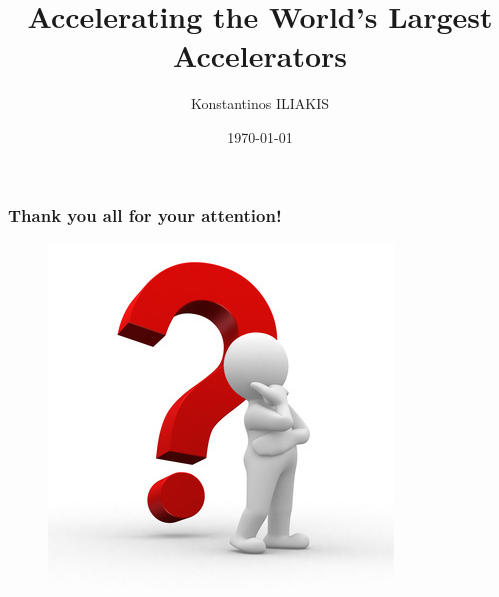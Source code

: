\documentclass{beamer}
\title[HPC @ CERN]{Accelerating the World's Largest Accelerators} %
\author{Konstantinos ILIAKIS} %
\institute{CERN/NTUA} %
\date{\today} %
\begin{document}
\begin{frame}
\titlepage %
\end{frame}






%	


\begin{frame}
	\frametitle{Thank you all for your attention!}
	\begin{figure}[h]
		\centering
		\includegraphics[width=.3\textwidth]{figures/question_mark.jpg}
	\end{figure}
\end{frame}

\end{document}
